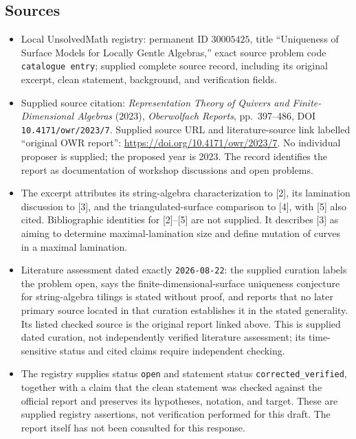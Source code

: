 \documentclass[11pt]{article}
\begin{document}
\subsection{Sources}
\begin{itemize}
\item Local UnsolvedMath registry: permanent ID \(30005425\), title ``Uniqueness of Surface Models for Locally Gentle Algebras,'' exact source problem code \texttt{catalogue entry}; supplied complete source record, including its original excerpt, clean statement, background, and verification fields.
\item Supplied source citation: \emph{Representation Theory of Quivers and Finite-Dimensional Algebras} (2023), \emph{Oberwolfach Reports}, pp.\ 397--486, DOI \texttt{10.4171/owr/2023/7}. Supplied source URL and literature-source link labelled ``original OWR report'': \url{https://doi.org/10.4171/owr/2023/7}. No individual proposer is supplied; the proposed year is 2023. The record identifies the report as documentation of workshop discussions and open problems.
\item The excerpt attributes its string-algebra characterization to [2], its lamination discussion to [3], and the triangulated-surface comparison to [4], with [5] also cited. Bibliographic identities for [2]--[5] are not supplied. It describes [3] as aiming to determine maximal-lamination size and define mutation of curves in a maximal lamination.
\item Literature assessment dated exactly \texttt{2026-08-22}: the supplied curation labels the problem open, says the finite-dimensional-surface uniqueness conjecture for string-algebra tilings is stated without proof, and reports that no later primary source located in that curation establishes it in the stated generality. Its listed checked source is the original report linked above. This is supplied dated curation, not independently verified literature assessment; its time-sensitive status and cited claims require independent checking.
\item The registry supplies status \texttt{open} and statement status \texttt{corrected\_verified}, together with a claim that the clean statement was checked against the official report and preserves its hypotheses, notation, and target. These are supplied registry assertions, not verification performed for this draft. The report itself has not been consulted for this response.
\end{itemize}
\end{document}
